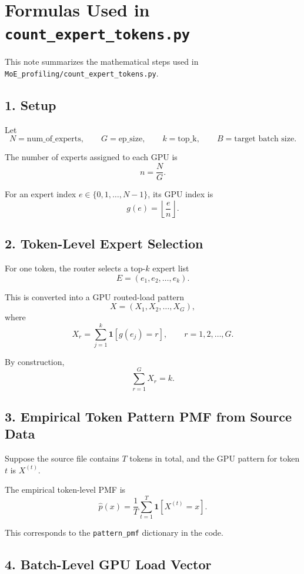 \section*{Formulas Used in \texttt{count\_expert\_tokens.py}}

This note summarizes the mathematical steps used in
\texttt{MoE\_profiling/count\_expert\_tokens.py}.

\subsection*{1. Setup}

Let
\[
N = \text{num\_of\_experts}, \qquad
G = \text{ep\_size}, \qquad
k = \text{top\_k}, \qquad
B = \text{target batch size}.
\]

The number of experts assigned to each GPU is
\[
n = \frac{N}{G}.
\]

For an expert index \(e \in \{0,1,\dots,N-1\}\), its GPU index is
\[
g(e) = \left\lfloor \frac{e}{n} \right\rfloor.
\]

\subsection*{2. Token-Level Expert Selection}

For one token, the router selects a top-\(k\) expert list
\[
E = (e_1, e_2, \dots, e_k).
\]

This is converted into a GPU routed-load pattern
\[
X = (X_1, X_2, \dots, X_G),
\]
where
\[
X_r = \sum_{j=1}^{k} \mathbf{1}[g(e_j) = r],
\qquad r = 1,2,\dots,G.
\]

By construction,
\[
\sum_{r=1}^{G} X_r = k.
\]

\subsection*{3. Empirical Token Pattern PMF from Source Data}

Suppose the source file contains \(T\) tokens in total, and the GPU pattern
for token \(t\) is \(X^{(t)}\).

The empirical token-level PMF is
\[
\hat{p}(x)
=
\frac{1}{T}
\sum_{t=1}^{T} \mathbf{1}[X^{(t)} = x].
\]

This corresponds to the \texttt{pattern\_pmf} dictionary in the code.

\subsection*{4. Batch-Level GPU Load Vector}

